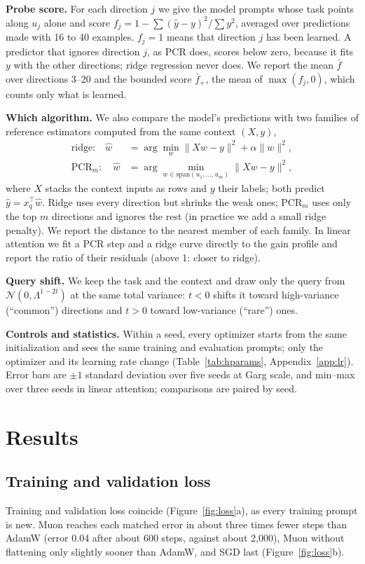 \documentclass{article}
\begin{document}
\textbf{Probe score.} For each direction $j$ we give the model prompts whose task points along $u_j$ alone and score $f_j = 1 - \sum(\hat y - y)^2/\sum y^2$, averaged over predictions made with 16 to 40 examples. $f_j = 1$ means that direction $j$ has been learned. A predictor that ignores direction $j$, as PCR does, scores below zero, because it fits $y$ with the other directions; ridge regression never does. We report the mean $\bar f$ over directions 3--20 and the bounded score $\bar f_+$, the mean of $\max(f_j, 0)$, which counts only what is learned.

\textbf{Which algorithm.} We also compare the model's predictions with two families of reference estimators computed from the same context $(X, y)$,
\begin{align}
\text{ridge:}\quad \hat w &= \arg\min_w \|Xw - y\|^2 + \alpha\|w\|^2, \\
\text{PCR}_m:\quad \hat w &= \arg\min_{w \in \mathrm{span}(u_1,\dots,u_m)} \|Xw - y\|^2,
\end{align}
where $X$ stacks the context inputs as rows and $y$ their labels; both predict $\hat y = x_q^\top \hat w$. Ridge uses every direction but shrinks the weak ones; PCR$_m$ uses only the top $m$ directions and ignores the rest (in practice we add a small ridge penalty). We report the distance to the nearest member of each family. In linear attention we fit a PCR step and a ridge curve directly to the gain profile and report the ratio of their residuals (above 1: closer to ridge).

\textbf{Query shift.} We keep the task and the context and draw only the query from $\mathcal{N}(0, \Lambda^{1-2t})$ at the same total variance: $t<0$ shifts it toward high-variance (``common'') directions and $t>0$ toward low-variance (``rare'') ones.

\textbf{Controls and statistics.} Within a seed, every optimizer starts from the same initialization and sees the same training and evaluation prompts; only the optimizer and its learning rate change (Table~\ref{tab:hparams}, Appendix~\ref{app:lr}). Error bars are $\pm1$ standard deviation over five seeds at Garg scale, and min--max over three seeds in linear attention; comparisons are paired by seed.

\section{Results}
\label{sec:results}

\subsection{Training and validation loss}
Training and validation loss coincide (Figure~\ref{fig:loss}a), as every training prompt is new. Muon reaches each matched error in about three times fewer steps than AdamW (error 0.04 after about 600 steps, against about 2,000), Muon without flattening only slightly sooner than AdamW, and SGD last (Figure~\ref{fig:loss}b).
\end{document}
